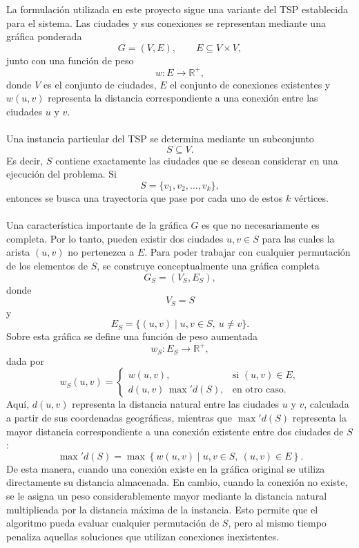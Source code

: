 \documentclass[12pt]{article}
\begin{document}
La formulación utilizada en este proyecto sigue una variante del TSP
establecida para el sistema. Las ciudades y sus conexiones se representan
mediante una gráfica ponderada
\[
    G=(V,E),
    \qquad
    E\subseteq V\times V,
\]
junto con una función de peso
\[
    w:E\longrightarrow \mathbb{R}^{+},
\]
donde \(V\) es el conjunto de ciudades, \(E\) el conjunto de conexiones
existentes y \(w(u,v)\) representa la distancia correspondiente a una
conexión entre las ciudades \(u\) y \(v\).
\\\\
Una instancia particular del TSP se determina mediante un subconjunto
\[
    S\subseteq V.
\]
Es decir, \(S\) contiene exactamente las ciudades que se desean considerar
en una ejecución del problema. Si
\[
    S=\{v_1,v_2,\ldots,v_k\},
\]
entonces se busca una trayectoria que pase por cada uno de estos \(k\)
vértices.
\\\\
Una característica importante de la gráfica \(G\) es que no necesariamente
es completa. Por lo tanto, pueden existir dos ciudades \(u,v\in S\) para
las cuales la arista \((u,v)\) no pertenezca a \(E\). Para poder trabajar
con cualquier permutación de los elementos de \(S\), se construye
conceptualmente una gráfica completa
\[
    G_S=(V_S,E_S),
\]
donde
\[
    V_S=S
\]
y
\[
    E_S=
    \{(u,v)\mid u,v\in S,\ u\neq v\}.
\]
Sobre esta gráfica se define una función de peso aumentada
\[
    w_S:E_S\longrightarrow\mathbb{R}^{+},
\]
dada por
\[
w_S(u,v)=
\begin{cases}
    w(u,v),
        & \text{si }(u,v)\in E,\\[2mm]
    d(u,v)\,\max{}' d(S),
        & \text{en otro caso}.
\end{cases}
\]
Aquí, \(d(u,v)\) representa la distancia natural entre las ciudades
\(u\) y \(v\), calculada a partir de sus coordenadas geográficas, mientras
que \(\max{}'d(S)\) representa la mayor distancia correspondiente a una
conexión existente entre dos ciudades de \(S\):
\[
    \max{}'d(S)
    =
    \max
    \left\{
        w(u,v)
        \mid
        u,v\in S,\ (u,v)\in E
    \right\}.
\]
De esta manera, cuando una conexión existe en la gráfica original se utiliza
directamente su distancia almacenada. En cambio, cuando la conexión no
existe, se le asigna un peso considerablemente mayor mediante la distancia
natural multiplicada por la distancia máxima de la instancia. Esto permite
que el algoritmo pueda evaluar cualquier permutación de \(S\), pero al mismo
tiempo penaliza aquellas soluciones que utilizan conexiones inexistentes.
\end{document}
